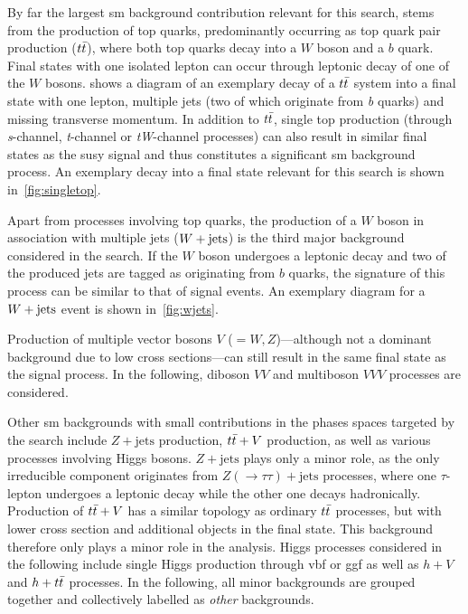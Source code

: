 By far the largest \gls{sm} background contribution relevant for this search, stems from the production of top quarks, predominantly occurring as top quark pair production ($t\bar{t}$), where both top quarks decay into a $W$ boson and a $b$ quark. Final states with one isolated lepton can occur through leptonic decay of one of the $W$ bosons.  shows a diagram of an exemplary decay of a $t\bar{t}$ system into a final state with one lepton, multiple jets (two of which originate from \textit{b} quarks) and missing transverse momentum. In addition to $t\bar{t}$, single top production (through \textit{s}-channel, \textit{t}-channel or \textit{tW}-channel processes) can also result in similar final states as the \gls{susy} signal and thus constitutes a significant \gls{sm} background process. An exemplary decay into a final state relevant for this search is shown in~\cref{fig:singletop}.

Apart from processes involving top quarks, the production of a $W$ boson in association with multiple jets ($W+\mathrm{jets}$) is the third major background considered in the \onelepton search. If the $W$ boson undergoes a leptonic decay and two of the produced jets are tagged as originating from $b$ quarks, the signature of this process can be similar to that of signal events. An exemplary diagram for a $W+\mathrm{jets}$ event is shown in~\cref{fig:wjets}.

Production of multiple vector bosons $V$ ($=W,Z$)---although not a dominant background due to low cross sections---can still result in the same final state as the signal process. In the following, diboson $VV$ and multiboson $VVV$ processes are considered.

Other \gls{sm} backgrounds with small contributions in the phases spaces targeted by the search include $Z+\mathrm{jets}$ production, $t\bar{t}+V$ production, as well as various processes involving Higgs bosons. $Z+\mathrm{jets}$ plays only a minor role, as the only irreducible component originates from $Z(\rightarrow\tau\tau)+\mathrm{jets}$ processes, where one $\tau$-lepton undergoes a leptonic decay while the other one decays hadronically. Production of $t\bar{t}+V$ has a similar topology as ordinary $t\bar{t}$ processes, but with lower cross section and additional objects in the final state. This background therefore only plays a minor role in the analysis. Higgs processes considered in the following include single Higgs production through \gls{vbf} or \gls{ggf} as well as $h+V$ and $h+t\bar{t}$ processes. In the following, all minor backgrounds are grouped together and collectively labelled as \textit{other} backgrounds. 

